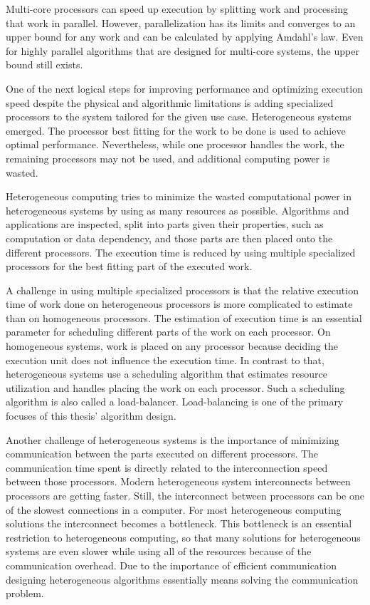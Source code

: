 Multi-core processors can speed up execution by splitting work and processing that work in parallel. However, parallelization has its limits and converges to an upper bound for any work and can be calculated by applying Amdahl's law\cite{amdahlValiditySingleProcessor1967}. Even for highly parallel algorithms that are designed for multi-core systems, the upper bound still exists.

One of the next logical steps for improving performance and optimizing execution speed despite the physical and algorithmic limitations is adding specialized processors to the system tailored for the given use case. Heterogeneous systems emerged. The processor best fitting for the work to be done is used to achieve optimal performance. Nevertheless, while one processor handles the work, the remaining processors may not be used, and additional computing power is wasted.

Heterogeneous computing tries to minimize the wasted computational power in heterogeneous systems by using as many resources as possible. Algorithms and applications are inspected, split into parts given their properties, such as computation or data dependency, and those parts are then placed onto the different processors. The execution time is reduced by using multiple specialized processors for the best fitting part of the executed work.

A challenge in using multiple specialized processors is that the relative execution time of work done on heterogeneous processors is more complicated to estimate than on homogeneous processors. The estimation of execution time is an essential parameter for scheduling different parts of the work on each processor. On homogeneous systems, work is placed on any processor because deciding the execution unit does not influence the execution time. In contrast to that, heterogeneous systems use a scheduling algorithm that estimates resource utilization and handles placing the work on each processor. Such a scheduling algorithm is also called a load-balancer. Load-balancing is one of the primary focuses of this thesis' algorithm design.

Another challenge of heterogeneous systems is the importance of minimizing communication between the parts executed on different processors. The communication time spent is directly related to the interconnection speed between those processors. Modern heterogeneous system interconnects between processors are getting faster. Still, the interconnect between processors can be one of the slowest connections in a computer. For most heterogeneous computing solutions the interconnect becomes a bottleneck. This bottleneck is an essential restriction to heterogeneous computing, so that many solutions for heterogeneous systems are even slower while using all of the resources because of the communication overhead. Due to the importance of efficient communication designing heterogeneous algorithms essentially means solving the communication problem.

